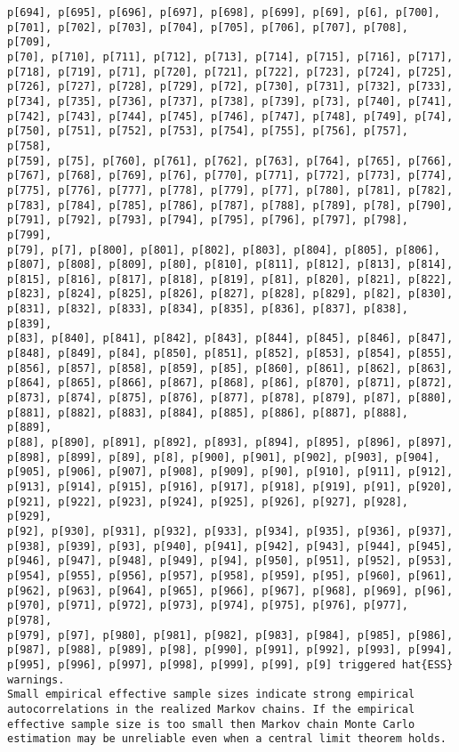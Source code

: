 \documentclass[
  letterpaper,
  DIV=11,
  numbers=noendperiod]{scrartcl}
\begin{document}
\begin{verbatim}
p[694], p[695], p[696], p[697], p[698], p[699], p[69], p[6], p[700],
p[701], p[702], p[703], p[704], p[705], p[706], p[707], p[708], p[709],
p[70], p[710], p[711], p[712], p[713], p[714], p[715], p[716], p[717],
p[718], p[719], p[71], p[720], p[721], p[722], p[723], p[724], p[725],
p[726], p[727], p[728], p[729], p[72], p[730], p[731], p[732], p[733],
p[734], p[735], p[736], p[737], p[738], p[739], p[73], p[740], p[741],
p[742], p[743], p[744], p[745], p[746], p[747], p[748], p[749], p[74],
p[750], p[751], p[752], p[753], p[754], p[755], p[756], p[757], p[758],
p[759], p[75], p[760], p[761], p[762], p[763], p[764], p[765], p[766],
p[767], p[768], p[769], p[76], p[770], p[771], p[772], p[773], p[774],
p[775], p[776], p[777], p[778], p[779], p[77], p[780], p[781], p[782],
p[783], p[784], p[785], p[786], p[787], p[788], p[789], p[78], p[790],
p[791], p[792], p[793], p[794], p[795], p[796], p[797], p[798], p[799],
p[79], p[7], p[800], p[801], p[802], p[803], p[804], p[805], p[806],
p[807], p[808], p[809], p[80], p[810], p[811], p[812], p[813], p[814],
p[815], p[816], p[817], p[818], p[819], p[81], p[820], p[821], p[822],
p[823], p[824], p[825], p[826], p[827], p[828], p[829], p[82], p[830],
p[831], p[832], p[833], p[834], p[835], p[836], p[837], p[838], p[839],
p[83], p[840], p[841], p[842], p[843], p[844], p[845], p[846], p[847],
p[848], p[849], p[84], p[850], p[851], p[852], p[853], p[854], p[855],
p[856], p[857], p[858], p[859], p[85], p[860], p[861], p[862], p[863],
p[864], p[865], p[866], p[867], p[868], p[86], p[870], p[871], p[872],
p[873], p[874], p[875], p[876], p[877], p[878], p[879], p[87], p[880],
p[881], p[882], p[883], p[884], p[885], p[886], p[887], p[888], p[889],
p[88], p[890], p[891], p[892], p[893], p[894], p[895], p[896], p[897],
p[898], p[899], p[89], p[8], p[900], p[901], p[902], p[903], p[904],
p[905], p[906], p[907], p[908], p[909], p[90], p[910], p[911], p[912],
p[913], p[914], p[915], p[916], p[917], p[918], p[919], p[91], p[920],
p[921], p[922], p[923], p[924], p[925], p[926], p[927], p[928], p[929],
p[92], p[930], p[931], p[932], p[933], p[934], p[935], p[936], p[937],
p[938], p[939], p[93], p[940], p[941], p[942], p[943], p[944], p[945],
p[946], p[947], p[948], p[949], p[94], p[950], p[951], p[952], p[953],
p[954], p[955], p[956], p[957], p[958], p[959], p[95], p[960], p[961],
p[962], p[963], p[964], p[965], p[966], p[967], p[968], p[969], p[96],
p[970], p[971], p[972], p[973], p[974], p[975], p[976], p[977], p[978],
p[979], p[97], p[980], p[981], p[982], p[983], p[984], p[985], p[986],
p[987], p[988], p[989], p[98], p[990], p[991], p[992], p[993], p[994],
p[995], p[996], p[997], p[998], p[999], p[99], p[9] triggered hat{ESS}
warnings.
Small empirical effective sample sizes indicate strong empirical
autocorrelations in the realized Markov chains. If the empirical
effective sample size is too small then Markov chain Monte Carlo
estimation may be unreliable even when a central limit theorem holds.
 
\end{verbatim}
\end{document}

